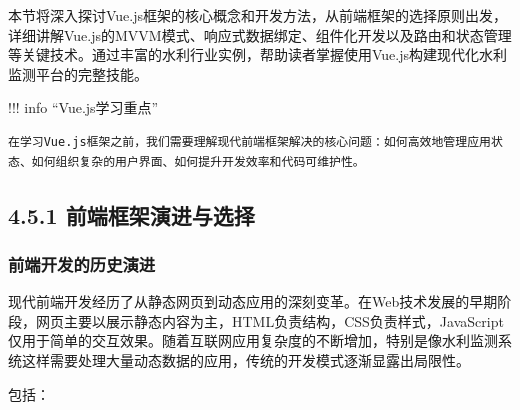 本节将深入探讨Vue.js框架的核心概念和开发方法，从前端框架的选择原则出发，详细讲解Vue.js的MVVM模式、响应式数据绑定、组件化开发以及路由和状态管理等关键技术。通过丰富的水利行业实例，帮助读者掌握使用Vue.js构建现代化水利监测平台的完整技能。

!!! info ``Vue.js学习重点''

\begin{verbatim}
在学习Vue.js框架之前，我们需要理解现代前端框架解决的核心问题：如何高效地管理应用状态、如何组织复杂的用户界面、如何提升开发效率和代码可维护性。
\end{verbatim}

\hypertarget{ux524dux7aefux6846ux67b6ux6f14ux8fdbux4e0eux9009ux62e9}{%
\subsection{4.5.1 前端框架演进与选择}\label{ux524dux7aefux6846ux67b6ux6f14ux8fdbux4e0eux9009ux62e9}}

\hypertarget{ux524dux7aefux5f00ux53d1ux7684ux5386ux53f2ux6f14ux8fdb}{%
\subsubsection{前端开发的历史演进}\label{ux524dux7aefux5f00ux53d1ux7684ux5386ux53f2ux6f14ux8fdb}}

现代前端开发经历了从静态网页到动态应用的深刻变革。在Web技术发展的早期阶段，网页主要以展示静态内容为主，HTML负责结构，CSS负责样式，JavaScript仅用于简单的交互效果。随着互联网应用复杂度的不断增加，特别是像水利监测系统这样需要处理大量动态数据的应用，传统的开发模式逐渐显露出局限性。

包括：

